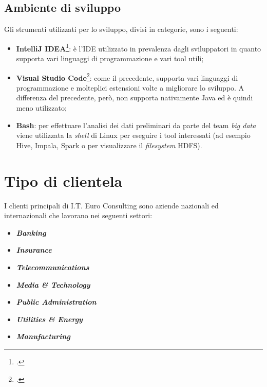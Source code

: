 \subsection{Ambiente di sviluppo}
Gli strumenti utilizzati per lo sviluppo, divisi in categorie, sono i seguenti:
\begin{itemize}
	\item \textbf{IntelliJ IDEA}\footcite{https://www.jetbrains.com/idea/}: è l'\gls{IDE} utilizzato in prevalenza dagli sviluppatori in quanto supporta vari linguaggi di programmazione e vari tool utili;
	\item \textbf{Visual Studio Code}\footcite{https://code.visualstudio.com/}: come il precedente, supporta vari linguaggi di programmazione e molteplici estensioni volte a migliorare lo sviluppo. A differenza del precedente, però, non supporta nativamente Java ed è quindi meno utilizzato;
	\item \textbf{\gls{Bash}}: per effettuare l'analisi dei dati preliminari da parte del team \textit{big data} viene utilizzata la \textit{shell} di Linux per eseguire i tool interessati (ad esempio Hive, Impala, Spark o per visualizzare il \textit{filesystem} HDFS).
\end{itemize}
\newpage
\section{Tipo di clientela}
I clienti principali di I.T. Euro Consulting sono aziende nazionali ed internazionali che lavorano nei seguenti settori:
\begin{itemize}
	\item \textit{\textbf{Banking}}
	\item \textit{\textbf{Insurance}}
	\item \textit{\textbf{Telecommunications}}
	\item \textit{\textbf{Media \& Technology}}
	\item \textit{\textbf{Public Administration}}
	\item \textit{\textbf{Utilities \& Energy}}
	\item \textit{\textbf{Manufacturing}}
\end{itemize}

